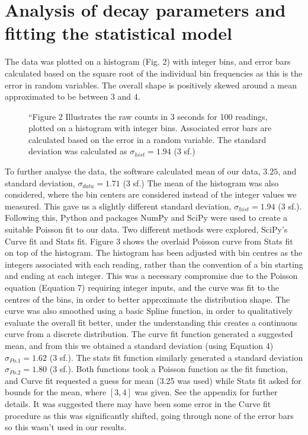 \documentclass[11pt]{article}
\begin{document}
\section{Analysis of decay parameters and fitting the statistical model}
The data was plotted on a histogram (Fig. 2) with integer bins, and error bars calculated based on the square root of the individual bin frequencies as this is the error in random variables.  The overall shape is positively skewed around a mean approximated to be between 3 and 4.\\
       \begin{figure}[]
        \begin{center}
            \def\svgwidth{\columnwidth}
            
             \caption{“Figure 2 Illustrates the raw counts in 3 seconds for 100 readings, plotted on a histogram with integer bins. Associated error bars are calculated based on the error in a random variable. The standard deviation was calculated as $\sigma_{hist} = 1.94$ (3 sf.)}
             \label{fig:experimental results 1}
        \end{center}
    \end{figure}
To further analyse the data, the software calculated mean of our data, $3.25$, and standard deviation, $\sigma_{data} = 1.71 $ (3 sf.)
The mean of the histogram was also considered, where the bin centers are considered instead of the integer values we measured. This gave us a slightly different standard deviation, $\sigma_{hist} = 1.94$ (3 sf.). 
Following this, Python and packages NumPy and SciPy were used to create a suitable Poisson fit to our data. Two different methods were explored, SciPy's Curve fit and Stats fit. 
Figure 3 shows the overlaid Poisson curve from Stats fit on top of the histogram. The histogram has been adjusted with bin centres as the integers associated with each reading, rather than the convention of a bin starting and ending at each integer. This was a necessary compromise due to the Poisson equation (Equation 7) requiring integer inputs, and the curve was fit to the centres of the bins, in order to better approximate the distribution shape. The curve was also smoothed using a basic Spline function, in order to qualitatively evaluate the overall fit better, under the understanding this creates a continuous curve from a discrete distribution.
The curve fit function generated a suggested mean, and from this we obtained a standard deviation (using Equation 4) $\sigma_{Po.1} = 1.62$ (3 sf.). The stats fit function similarly generated a standard deviation $\sigma_{Po.2} = 1.80 $ (3 sf.). Both functions took a Poisson function as the fit function, and Curve fit requested a guess for mean (3.25 was used) while Stats fit asked for bounds for the mean, where $[3,4]$ was given. See the appendix for further details. It was suggested there may have been some error in the Curve fit procedure as this was significantly shifted, going through none of the error bars so this wasn't used in our results. 
\end{document}
